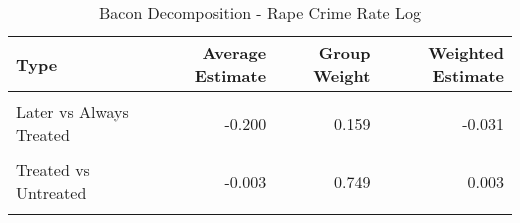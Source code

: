 \begin{table}[H]

\caption{\label{tab:tab:bacondecompositionRape}Bacon Decomposition - Rape Crime Rate Log}
\centering
\begin{tabular}[t]{lrrr}
\toprule
Type & Average Estimate & Group Weight & Weighted Estimate\\
\midrule
\cellcolor{gray!6}{Earlier vs Later Treated} & \cellcolor{gray!6}{-0.026} & \cellcolor{gray!6}{0.068} & \cellcolor{gray!6}{-0.003}\\
Later vs Always Treated & -0.200 & 0.159 & -0.031\\
\cellcolor{gray!6}{Later vs Earlier Treated} & \cellcolor{gray!6}{-0.011} & \cellcolor{gray!6}{0.023} & \cellcolor{gray!6}{-0.002}\\
Treated vs Untreated & -0.003 & 0.749 & 0.003\\
\cellcolor{gray!6}{Total TWFE} & \cellcolor{gray!6}{NaN} & \cellcolor{gray!6}{NaN} & \cellcolor{gray!6}{-0.032}\\
\bottomrule
\end{tabular}
\end{table}
